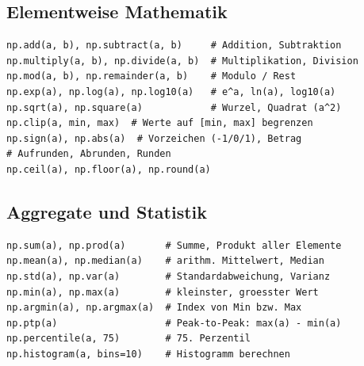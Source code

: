 \subsection{Elementweise Mathematik}\label{sec:06-mathematik}
\begin{codebox}
\begin{lstlisting}[style=CodeExpert]
np.add(a, b), np.subtract(a, b)     # Addition, Subtraktion
np.multiply(a, b), np.divide(a, b)  # Multiplikation, Division
np.mod(a, b), np.remainder(a, b)    # Modulo / Rest
np.exp(a), np.log(a), np.log10(a)   # e^a, ln(a), log10(a)
np.sqrt(a), np.square(a)            # Wurzel, Quadrat (a^2)
np.clip(a, min, max)  # Werte auf [min, max] begrenzen
np.sign(a), np.abs(a)  # Vorzeichen (-1/0/1), Betrag
# Aufrunden, Abrunden, Runden
np.ceil(a), np.floor(a), np.round(a)
\end{lstlisting}
\end{codebox}


\subsection{Aggregate und Statistik}\label{sec:06-aggregate-und-statistik}
\begin{codebox}
\begin{lstlisting}[style=CodeExpert]
np.sum(a), np.prod(a)       # Summe, Produkt aller Elemente
np.mean(a), np.median(a)    # arithm. Mittelwert, Median
np.std(a), np.var(a)        # Standardabweichung, Varianz
np.min(a), np.max(a)        # kleinster, groesster Wert
np.argmin(a), np.argmax(a)  # Index von Min bzw. Max
np.ptp(a)                   # Peak-to-Peak: max(a) - min(a)
np.percentile(a, 75)        # 75. Perzentil
np.histogram(a, bins=10)    # Histogramm berechnen
\end{lstlisting}
\end{codebox}


